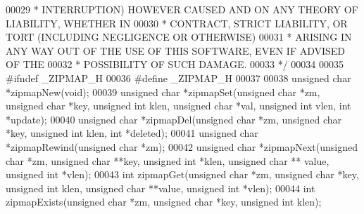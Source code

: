 \begin{DoxyCode}
00029 \textcolor{comment}{ * INTERRUPTION) HOWEVER CAUSED AND ON ANY THEORY OF LIABILITY, WHETHER IN}
00030 \textcolor{comment}{ * CONTRACT, STRICT LIABILITY, OR TORT (INCLUDING NEGLIGENCE OR OTHERWISE)}
00031 \textcolor{comment}{ * ARISING IN ANY WAY OUT OF THE USE OF THIS SOFTWARE, EVEN IF ADVISED OF THE}
00032 \textcolor{comment}{ * POSSIBILITY OF SUCH DAMAGE.}
00033 \textcolor{comment}{ */}
00034 
00035 \textcolor{preprocessor}{#}\textcolor{preprocessor}{ifndef} \textcolor{preprocessor}{\_ZIPMAP\_H}
00036 \textcolor{preprocessor}{#}\textcolor{preprocessor}{define} \textcolor{preprocessor}{\_ZIPMAP\_H}
00037 
00038 \textcolor{keywordtype}{unsigned} \textcolor{keywordtype}{char} *zipmapNew(\textcolor{keywordtype}{void});
00039 \textcolor{keywordtype}{unsigned} \textcolor{keywordtype}{char} *zipmapSet(\textcolor{keywordtype}{unsigned} \textcolor{keywordtype}{char} *zm, \textcolor{keywordtype}{unsigned} \textcolor{keywordtype}{char} *key, \textcolor{keywordtype}{unsigned} \textcolor{keywordtype}{int} klen, \textcolor{keywordtype}{unsigned} \textcolor{keywordtype}{char} *val,
       \textcolor{keywordtype}{unsigned} \textcolor{keywordtype}{int} vlen, \textcolor{keywordtype}{int} *update);
00040 \textcolor{keywordtype}{unsigned} \textcolor{keywordtype}{char} *zipmapDel(\textcolor{keywordtype}{unsigned} \textcolor{keywordtype}{char} *zm, \textcolor{keywordtype}{unsigned} \textcolor{keywordtype}{char} *key, \textcolor{keywordtype}{unsigned} \textcolor{keywordtype}{int} klen, \textcolor{keywordtype}{int} *deleted);
00041 \textcolor{keywordtype}{unsigned} \textcolor{keywordtype}{char} *zipmapRewind(\textcolor{keywordtype}{unsigned} \textcolor{keywordtype}{char} *zm);
00042 \textcolor{keywordtype}{unsigned} \textcolor{keywordtype}{char} *zipmapNext(\textcolor{keywordtype}{unsigned} \textcolor{keywordtype}{char} *zm, \textcolor{keywordtype}{unsigned} \textcolor{keywordtype}{char} **key, \textcolor{keywordtype}{unsigned} \textcolor{keywordtype}{int} *klen, \textcolor{keywordtype}{unsigned} \textcolor{keywordtype}{char} **
      value, \textcolor{keywordtype}{unsigned} \textcolor{keywordtype}{int} *vlen);
00043 \textcolor{keywordtype}{int} zipmapGet(\textcolor{keywordtype}{unsigned} \textcolor{keywordtype}{char} *zm, \textcolor{keywordtype}{unsigned} \textcolor{keywordtype}{char} *key, \textcolor{keywordtype}{unsigned} \textcolor{keywordtype}{int} klen, \textcolor{keywordtype}{unsigned} \textcolor{keywordtype}{char} **value, \textcolor{keywordtype}{
      unsigned} \textcolor{keywordtype}{int} *vlen);
00044 \textcolor{keywordtype}{int} zipmapExists(\textcolor{keywordtype}{unsigned} \textcolor{keywordtype}{char} *zm, \textcolor{keywordtype}{unsigned} \textcolor{keywordtype}{char} *key, \textcolor{keywordtype}{unsigned} \textcolor{keywordtype}{int} klen);

\end{DoxyCode}

